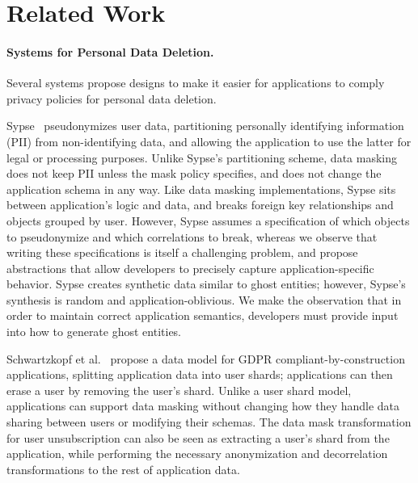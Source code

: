 \section{Related Work}
\label{sec:related}

\paragraph{Systems for Personal Data Deletion.}
Several systems propose designs to make it easier for applications to comply privacy policies for
personal data deletion.

Sypse~\cite{sypse} pseudonymizes user data, partitioning personally identifying information (PII)
from non-identifying data, and allowing the application to use the latter for legal or processing
purposes. 
%
Unlike Sypse's partitioning scheme, data masking does not keep PII unless the mask policy specifies,
and does not change the application schema in any way.
%
Like data masking implementations, Sypse sits between application's logic and data, and breaks
foreign key relationships and objects grouped by user. However, Sypse assumes a specification of
which objects to pseudonymize and which correlations to break, whereas we observe that writing these
specifications is itself a challenging problem, and propose abstractions that allow developers to
precisely capture application-specific behavior. 
Sypse creates synthetic data similar to ghost entities; however, Sypse's synthesis is random and
application-oblivious. We make the observation that in order to maintain correct application
semantics, developers must provide input into how to generate ghost entities.


Schwartzkopf et al.~\cite{usershards} propose a data model for GDPR compliant-by-construction
applications, splitting application data into user shards; applications can then erase a user by
removing the user's shard. Unlike a user shard model, applications can support data masking without
changing how they handle data sharing between users or modifying their schemas. The data mask
transformation for user unsubscription can also be seen as extracting a user's shard from the
application, while performing the necessary anonymization and decorrelation transformations to the
rest of application data.


